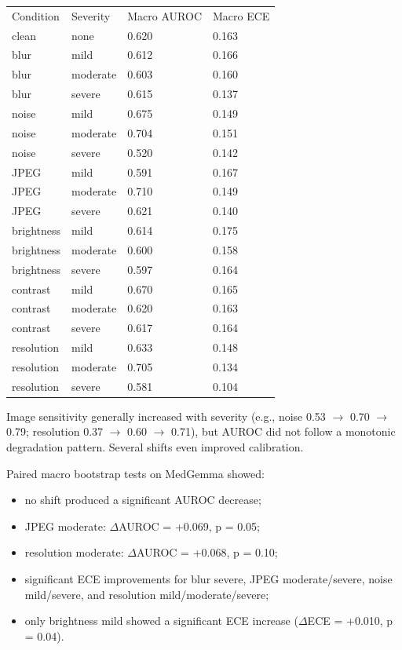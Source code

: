 \begin{table}[t]
\centering
\small
\begin{tabular}{llll}
\hline
Condition & Severity & Macro AUROC & Macro ECE \\
clean & none & 0.620 & 0.163 \\
blur & mild & 0.612 & 0.166 \\
blur & moderate & 0.603 & 0.160 \\
blur & severe & 0.615 & 0.137 \\
noise & mild & 0.675 & 0.149 \\
noise & moderate & 0.704 & 0.151 \\
noise & severe & 0.520 & 0.142 \\
JPEG & mild & 0.591 & 0.167 \\
JPEG & moderate & 0.710 & 0.149 \\
JPEG & severe & 0.621 & 0.140 \\
brightness & mild & 0.614 & 0.175 \\
brightness & moderate & 0.600 & 0.158 \\
brightness & severe & 0.597 & 0.164 \\
contrast & mild & 0.670 & 0.165 \\
contrast & moderate & 0.620 & 0.163 \\
contrast & severe & 0.617 & 0.164 \\
resolution & mild & 0.633 & 0.148 \\
resolution & moderate & 0.705 & 0.134 \\
resolution & severe & 0.581 & 0.104 \\
\hline
\end{tabular}
\end{table}


Image sensitivity generally increased with severity (e.g., noise 0.53 $\rightarrow$ 0.70 $\rightarrow$ 0.79; resolution 0.37 $\rightarrow$ 0.60 $\rightarrow$ 0.71), but AUROC did not follow a monotonic degradation pattern. Several shifts even improved calibration.

Paired macro bootstrap tests on MedGemma showed:

\begin{itemize}
\item no shift produced a significant AUROC decrease;
\item JPEG moderate: $\Delta$AUROC = +0.069, p = 0.05;
\item resolution moderate: $\Delta$AUROC = +0.068, p = 0.10;
\item significant ECE improvements for blur severe, JPEG moderate/severe, noise mild/severe, and resolution mild/moderate/severe;
\item only brightness mild showed a significant ECE increase ($\Delta$ECE = +0.010, p = 0.04).
\end{itemize}

